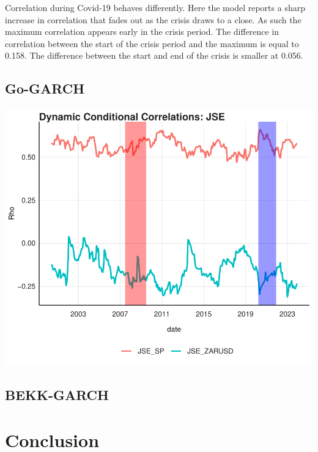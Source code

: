 \documentclass[11pt,preprint, authoryear]{elsarticle}
\let\origfigure\figure
\let\endorigfigure\endfigure
\renewenvironment{figure}[1][2] {
    \expandafter\origfigure\expandafter[H]
} {
    \endorigfigure
}
\numberwithin{equation}{section}
\numberwithin{figure}{section}
\numberwithin{table}{section}
\begin{document}
Correlation during Covid-19 behaves differently. Here the model reports
a sharp increase in correlation that fades out as the crisis draws to a
close. As such the maximum correlation appears early in the crisis
period. The difference in correlation between the start of the crisis
period and the maximum is equal to 0.158. The difference between the
start and end of the crisis is smaller at 0.056.

\hypertarget{go-garch-1}{%
\subsection{Go-GARCH}\label{go-garch-1}}

\begin{figure}[H]

{\centering \includegraphics{Template_files/figure-latex/Figure5-1} 

}

\caption{GO-GARCH \label{Figure5}}\label{fig:Figure5}
\end{figure}

\hypertarget{bekk-garch-1}{%
\subsection{BEKK-GARCH}\label{bekk-garch-1}}

\hypertarget{conclusion}{%
\section{Conclusion}\label{conclusion}}
\end{document}
